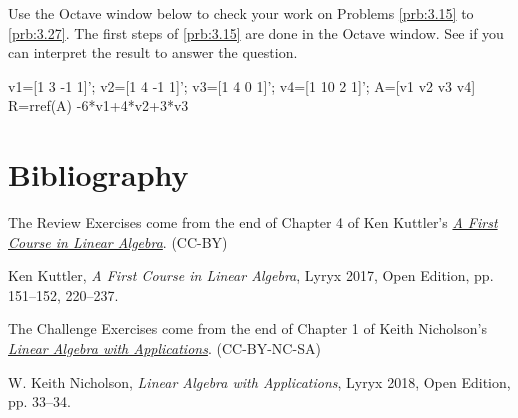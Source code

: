 \documentclass{ximera}
\begin{document}
\begin{problem}\label{oct:lindep}
Use the Octave window below to check your work on Problems \ref{prb:3.15} to \ref{prb:3.27}.  The first steps of \ref{prb:3.15} are done in the Octave window.  See if you can interpret the result to answer the question.

v1=[1 3 -1 1]';
v2=[1 4 -1 1]';
v3=[1 4 0 1]';
v4=[1 10 2 1]';
A=[v1 v2 v3 v4]
R=rref(A)
-6*v1+4*v2+3*v3
\end{problem}

\section*{Bibliography}
The Review Exercises come from the end of Chapter 4 of Ken Kuttler's \href{https://open.umn.edu/opentextbooks/textbooks/a-first-course-in-linear-algebra-2017}{\it A First Course in Linear Algebra}. (CC-BY)

Ken Kuttler, {\it  A First Course in Linear Algebra}, Lyryx 2017, Open Edition, pp. 151--152, 220--237. 

The Challenge Exercises come from the end of Chapter 1 of Keith Nicholson's \href{https://open.umn.edu/opentextbooks/textbooks/linear-algebra-with-applications}{\it Linear Algebra with Applications}. (CC-BY-NC-SA)

W. Keith Nicholson, {\it Linear Algebra with Applications}, Lyryx 2018, Open Edition, pp. 33--34. 
\end{document}
